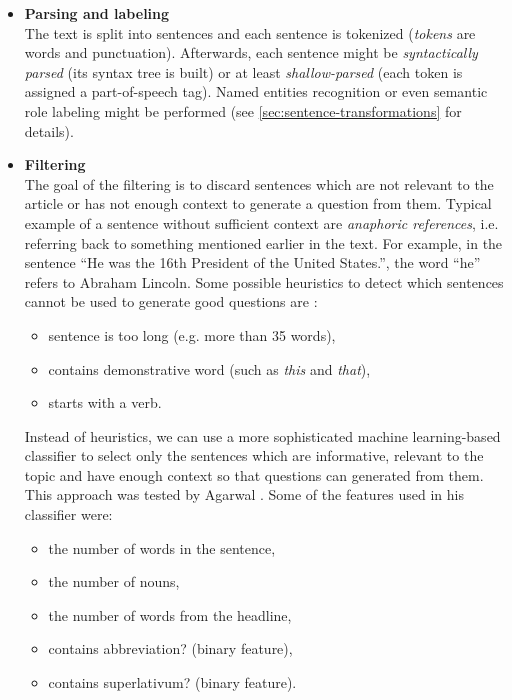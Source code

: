 \documentclass[12pt, twoside]{fithesis2}
\renewcommand{\_}{\leavevmode \kern0.07em\vbox{\hrule width0.4em}}
\newcommand{\squarebullet}{\textcolor{black}{\raisebox{0.15em}{\rule{4pt}{4pt}}}}
\newcommand{\emptysquarebullet}{\textcolor{black}{\raisebox{0.10em}{\tiny$\square$}}}
\newenvironment{myItemize}{
  \begin{itemize}[leftmargin=2em,rightmargin=1em,itemsep=\parskip ,parsep=0em,topsep=0em,partopsep=0em]
  \renewcommand{\labelitemi}{\squarebullet}
  \renewcommand{\labelitemii}{\textbullet}
}{
  \end{itemize}
}
\begin{document}
\begin{myItemize}
  \item \textbf{Parsing and labeling}\\
    The text is split into sentences and each sentence is tokenized (\emph{tokens} are words and punctuation).
    Afterwards, each sentence might be \emph{syntactically parsed} (its syntax tree is built)
    or at least \textit{shallow-parsed} (each token is assigned a part-of-speech tag).
    Named entities recognition or even semantic role labeling might be performed
    (see \autoref{sec:sentence-transformations} for details).

  \item \textbf{Filtering}\\
    The goal of the filtering is to discard sentences which are not relevant to the article or has not enough context to generate a question from them.
    Typical example of a sentence without sufficient context are \emph{anaphoric references},
    i.e. referring back to something mentioned earlier in the text.
    For example, in the sentence ``He was the 16th President of the United States.'',
    the word ``he'' refers to Abraham Lincoln.
  Some possible heuristics to detect which sentences cannot be used to generate good questions are \cite{questions-wolfe}:
  \begin{itemize}
  \item sentence is too long (e.g. more than 35 words),
  \item contains demonstrative word (such as \emph{this} and \emph{that}),
  \item starts with a verb.
  \end{itemize}

  Instead of heuristics, we can use a more sophisticated machine learning-based classifier to select only the sentences which are informative, relevant to the topic and have enough context so that questions can generated from them. This approach was tested by Agarwal \cite{question-gen-textbooks}.
Some of the features used in his classifier were:
  \begin{itemize}
  \item the number of words in the sentence,
  \item the number of nouns,
  \item the number of words from the headline,
  \item contains abbreviation? (binary feature),
  \item contains superlativum? (binary feature).
  \end{itemize}


\end{myItemize}
\end{document}
